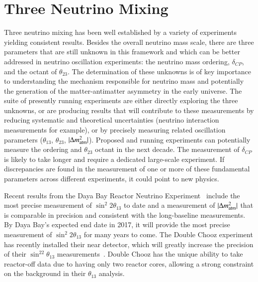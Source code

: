 \section{Three Neutrino Mixing}
\label{sec:3NuMixing}

Three neutrino mixing has been well established by a variety of
experiments yielding consistent results. Besides the overall neutrino
mass scale, there are three parameters that are still unknown in this
framework and which can be better addressed in neutrino oscillation
experiments: the neutrino mass ordering, $\delta_{CP}$, and the octant
of $\theta_{23}$.  The determination of these unknowns is of key
importance to understanding the mechanism responsible for neutrino
mass and potentially the generation of the matter-antimatter
asymmetry in the early universe.  The suite of presently running
experiments are either directly exploring the three unknowns, or are
producing results that will contribute to these measurements
by reducing systematic and theoretical uncertainties (neutrino
interaction measurements for example), or by precisely measuring
related oscillation parameters ($\theta_{13}$, $\theta_{23}$, $|\Delta
m^{2}_{\textnormal{atm}}|$).  Proposed and running experiments can
potentially measure the ordering and $\theta_{23}$ octant in the next
decade.  The measurement of $\delta_{CP}$ is likely to take longer and
require a dedicated large-scale experiment.  If discrepancies are
found in the measurement of one or more of these fundamental
parameters across different experiments, it could point to new
physics.

Recent results from the Daya Bay Reactor Neutrino
Experiment~\cite{Zhang:2015fya} include the most precise measurement
of $\sin^{2}2\theta_{13}$ to date and a measurement of $|\Delta
m^{2}_{\textnormal{atm}}|$ that is comparable in precision and
consistent with the long-baseline measurements.  By Daya Bay's
expected end date in 2017, it will provide the most precise
measurement of $\sin^{2}2\theta_{13}$ for many years to come.  The
Double Chooz experiment has recently installed their near detector,
which will greatly increase the precision of their
$\sin^22\theta_{13}$ measurements~\cite{Abe:2014bwa}. Double
Chooz has the unique ability to take reactor-off data due to having
only two reactor cores, allowing a strong constraint on the background
in their $\theta_{13}$ analysis.

